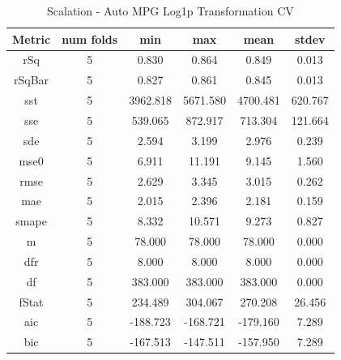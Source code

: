 \documentclass{article}
\begin{document}
\begin{table}[H]
\centering
\caption{Scalation - Auto MPG Log1p Transformation CV}
\label{tab:Scalation - Auto MPG Log1p Transformation CV}
\begin{tabular}{|c|c|c|c|c|c|}\hline
Metric & num folds & min & max & mean & stdev \\ \hline \hline
rSq & 5 & 0.830 & 0.864 & 0.849 & 0.013 \\ \hline
rSqBar & 5 & 0.827 & 0.861 & 0.845 & 0.013 \\ \hline
sst & 5 & 3962.818 & 5671.580 & 4700.481 & 620.767 \\ \hline
sse & 5 & 539.065 & 872.917 & 713.304 & 121.664 \\ \hline
sde & 5 & 2.594 & 3.199 & 2.976 & 0.239 \\ \hline
mse0 & 5 & 6.911 & 11.191 & 9.145 & 1.560 \\ \hline
rmse & 5 & 2.629 & 3.345 & 3.015 & 0.262 \\ \hline
mae & 5 & 2.015 & 2.396 & 2.181 & 0.159 \\ \hline
smape & 5 & 8.332 & 10.571 & 9.273 & 0.827 \\ \hline
m & 5 & 78.000 & 78.000 & 78.000 & 0.000 \\ \hline
dfr & 5 & 8.000 & 8.000 & 8.000 & 0.000 \\ \hline
df & 5 & 383.000 & 383.000 & 383.000 & 0.000 \\ \hline
fStat & 5 & 234.489 & 304.067 & 270.208 & 26.456 \\ \hline
aic & 5 & -188.723 & -168.721 & -179.160 & 7.289 \\ \hline
bic & 5 & -167.513 & -147.511 & -157.950 & 7.289 \\ \hline
\end{tabular}
\end{table}
\end{document}
